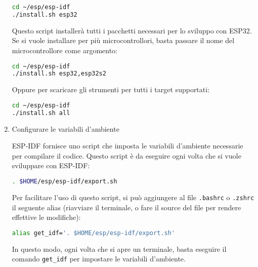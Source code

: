 \documentclass[a4paper]{article}
\begin{document}
\begin{enumerate}
\begin{lstlisting}[language=Bash]
cd ~/esp/esp-idf
./install.sh esp32
\end{lstlisting}
    
    Questo script installerà tutti i pacchetti necessari per lo sviluppo con ESP32. Se
    si vuole installare per più microcontrollori, basta passare il nome del microcontrollore
    come argomento:

\begin{lstlisting}[language=Bash]
cd ~/esp/esp-idf
./install.sh esp32,esp32s2
\end{lstlisting}

    Oppure per scaricare gli strumenti per tutti i target supportati:

\begin{lstlisting}[language=Bash]
cd ~/esp/esp-idf
./install.sh all
\end{lstlisting}

  \item Configurare le variabili d'ambiente

    \vspace{1em}
    \noindent
    ESP-IDF fornisce uno script che imposta le variabili d'ambiente necessarie per
    compilare il codice. Questo script è da eseguire ogni volta che si vuole sviluppare
    con ESP-IDF:

\begin{lstlisting}[language=Bash]
. $HOME/esp/esp-idf/export.sh
\end{lstlisting}

    Per facilitare l'uso di questo script, si può aggiungere al file \lstinline{.bashrc}
    o \lstinline{.zshrc} il seguente alias (riavviare il terminale, o fare il source
    del file per rendere effettive le modifiche):

\begin{lstlisting}[language=Bash]
alias get_idf='. $HOME/esp/esp-idf/export.sh'
\end{lstlisting}

    In questo modo, ogni volta che si apre un terminale, basta eseguire il comando
    \lstinline{get_idf} per impostare le variabili d'ambiente.
\end{enumerate}
\end{document}
